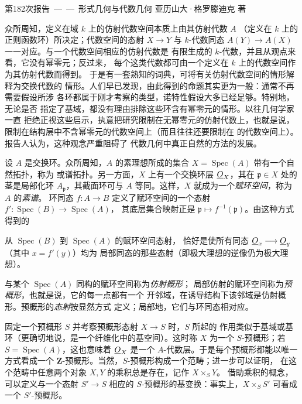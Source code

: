 \unit{第182次报告——形式几何与代数几何}
%
  {亚历山大·格罗滕迪克 著}


众所周知，定义在域 $k$ 上的仿射代数空间本质上由其仿射代数 $A$
（定义在 $k$ 上的正则函数环）所决定；代数空间的态射
$X\longrightarrow Y$ 与 $k$-代数同态
$A(Y)\longrightarrow A(X)$ 一一对应。与一个代数空间相应的仿射代数是
有限生成的 $k$-代数，并且从观点来看，它没有幂零元；反过来，
每个这类代数都可由一个定义在 $k$ 上的代数空间作为其仿射代数而得到。
于是有一套熟知的词典，可将有关仿射代数空间的情形解释为交换代数的
情形。人们早已发现，由此得到的命题其实更为一般：通常不再需要假设所涉
各环都属于刚才考察的类型，诺特性假设大多已经足够。特别地，无论是否
指定了基域，都没有理由排除这些环含有幂零元的情形。以往几何学家一直
拒绝正视这些启示，执意把研究限制在无幂零元的仿射代数上，也就是说，
限制在结构层中不含幂零元的代数空间上（而且往往还要限制在
的代数空间上）。报告人认为，这种观念严重阻碍了
代数几何中真正自然的方法的发展。

设 $A$ 是交换环。众所周知，$A$ 的素理想所成的集合
$X=\operatorname{Spec}(A)$ 带有一个自然拓扑，称为
或谱拓扑。另一方面，$X$ 上有一个交换环层 $\underline{O}_X$，其在
$\mathfrak p\in X$ 处的茎是局部化环 $A_{\mathfrak p}$，其截面环可与 $A$
等同。这样，$X$ 就成为一个\emph{赋环空间}，称为 $A$ 的\emph{素谱}。
环同态 $f:A\longrightarrow B$ 定义了赋环空间的一个态射
$f':\operatorname{Spec}(B)\longrightarrow\operatorname{Spec}(A)$，
其底层集合映射正是
$\mathfrak p\longmapsto f^{-1}(\mathfrak p)$。由这种方式得到的

从 $\operatorname{Spec}(B)$ 到 $\operatorname{Spec}(A)$ 的赋环空间态射，
恰好是使所有同态 $\underline{O}_x\longrightarrow\underline{O}_y$（其中 $x=f'(y)$）均为
局部同态的那些态射（即极大理想的逆像仍为极大理想）。

与某个 $\operatorname{Spec}(A)$ 同构的赋环空间称为\emph{仿射概形}；
局部仿射的赋环空间称为\emph{预概形}，也就是说，它的每一点都有一个
开邻域，在诱导结构下该邻域是仿射概形。预概形的\emph{态射}按显然方式
定义；局部地，它们与环同态相对应。

固定一个预概形 $S$ 并考察预概形态射 $X\longrightarrow S$ 时，$S$ 所起的
作用类似于基域或基环（更确切地说，是一个纤维化中的基空间）。这时称
$X$ 为一个 $S$-预概形；若 $S=\operatorname{Spec}(A)$，这也意味着
$\underline{O}_X$ 是一个 $A$-代数层。于是每个预概形都能以唯一方式看成一个
$\mathbf Z$-预概形。当然，$S$-预概形构成一个范畴；进一步可以证明，
在这个范畴中任意两个对象 $X,Y$ 的乘积总是存在，记作 $X\times_S Y$。
借助乘积的概念，可以定义与一个态射 $S'\longrightarrow S$ 相应的
$S$-预概形的基变换：事实上，$X\times_S S'$ 可看成一个 $S'$-预概形。

